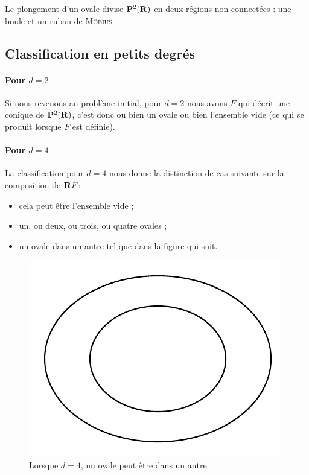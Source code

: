 \documentclass{livre}
\begin{document}
Le plongement d'un ovale divise $\mathbf{P}^{2}(\mathbf{R})$ en deux régions non connectées : une boule et un ruban de \textsc{Möbius}.

\subsection*{Classification en petits degrés}

\paragraph{Pour $d=2$}Si nous revenons au problème initial, pour $d=2$ nous avons $F$ qui décrit une conique de $\mathbf{P}^{2}(\mathbf{R})$, c'est donc ou bien un ovale ou bien l'ensemble vide (ce qui se produit lorsque $F$ est définie).


\paragraph{Pour $d=4$}La classification pour $d=4$ nous donne la distinction de cas suivante sur la composition de $\mathbf{R} F$:
\begin{itemize}
\item cela peut être l'ensemble vide ;
\item un, ou deux, ou trois, ou quatre ovales ;
\item un ovale dans un autre tel que dans la figure qui suit.
\end{itemize}

\begin{figure}[H]
\begin{center}
\includegraphics[scale=0.6]{Figures/fig1}
\end{center}
\caption{Lorsque $d=4$, un ovale peut être dans un autre}\label{fig1}
\end{figure}
\end{document}
